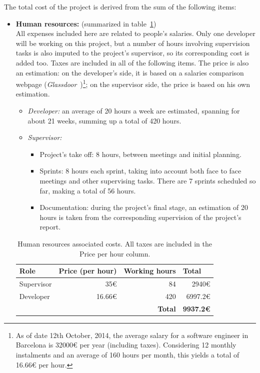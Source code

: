 The total cost of the project is derived from the sum of the following items:

\begin{itemize}
	\item \textbf{Human resources:} (summarized in table~\ref{table:human-resources})\\
	All expenses included here are related to people’s salaries. Only one developer will be working on this project, but a number of hours involving supervision tasks is also imputed to the project’s supervisor, so its corresponding cost is added too. Taxes are included in all of the following items. The price is also an estimation: on the developer’s side, it is based on a salaries comparison webpage (\textit{Glassdoor}~\cite{website:glassdoor})\footnote{As of date 12th October, 2014, the average salary for a software engineer in Barcelona is 32000€ per year (including taxes). Considering 12 monthly instalments and an average of 160 hours per month, this yields a total of 16.66€ per hour.}; on the supervisor side, the price is based on his own estimation.
	\begin{itemize}
		\item \textit{Developer:} an average of 20 hours a week are estimated, spanning for about 21 weeks, summing up a total of 420 hours.
		\item \textit{Supervisor:}
		\begin{itemize}
			\item Project’s take off: 8 hours, between meetings and initial planning.
			\item Sprints: 8 hours each sprint, taking into account both face to face meetings and other supervising tasks. There are 7 sprints scheduled so far, making a total of 56 hours.
			\item Documentation: during the project’s final stage, an estimation of 20 hours is taken from the corresponding supervision of the project’s report.
		\end{itemize}
	\end{itemize}
	\begin{table}[h]
	\centering
	\begin{tabular}{lllr}
	\hline
	\textbf{Role} & \textbf{Price (per hour)} & \textbf{Working  hours} & \multicolumn{1}{l}{\textbf{Total}} \\ \hline
	Supervisor & \multicolumn{1}{r}{35€} & \multicolumn{1}{r}{84} & 2940€ \\
	Developer & \multicolumn{1}{r}{16.66€} & \multicolumn{1}{r}{420} & 6997.2€ \\ \hline
	 &  & \multicolumn{1}{r}{\textbf{Total}} & \textbf{9937.2€}
	\end{tabular}
	\caption{Human resources associated costs. All taxes are included in the Price per hour column.}
	\label{table:human-resources}
	\end{table}
	

\end{itemize}
